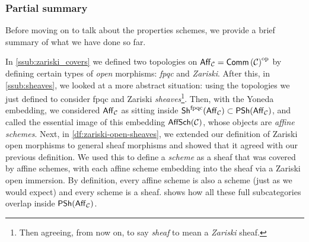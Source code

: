 



    \subsubsection{Partial summary} %
    \label{ssub:partial_summary}

        Before moving on to talk about the properties schemes, we provide a brief summary of what we have done so far.

        In \cref{ssub:zariski_covers} we defined two topologies on $\mathsf{Aff}_{\mathcal{C}}={\mathsf{Comm}\left({\mathcal{C}}\right)}^{\mathrm{op}}$ by defining certain types of \emph{open} morphisms: \emph{fpqc} and \emph{Zariski}.
        After this, in \cref{ssub:sheaves}, we looked at a more abstract situation: using the topologies we just defined to consider fpqc and Zariski \emph{sheaves}\footnote{
            Then agreeing, from now on, to say \emph{sheaf} to mean a \emph{Zariski} sheaf.
        }.
        Then, with the Yoneda embedding, we considered $\mathsf{Aff}_{\mathcal{C}}$ as sitting inside $\mathsf{Sh}^\text{fpqc}(\mathsf{Aff}_{\mathcal{C}})\subset\mathsf{PSh}(\mathsf{Aff}_{\mathcal{C}})$, and called the essential image of this embedding $\mathsf{AffSch}(\mathcal{C})$, whose objects are \emph{affine schemes}.
        Next, in \cref{df:zariski-open-sheaves}, we extended our definition of Zariski open morphisms to general sheaf morphisms and showed that it agreed with our previous definition.
        We used this to define a \emph{scheme} as a sheaf that was covered by affine schemes, with each affine scheme embedding into the sheaf via a Zariski open immersion.
        By definition, every affine scheme is also a scheme (just as we would expect) and every scheme is a sheaf.
         shows how all these full subcategories overlap inside $\mathsf{PSh}(\mathsf{Aff}_{\mathcal{C}})$.
    
